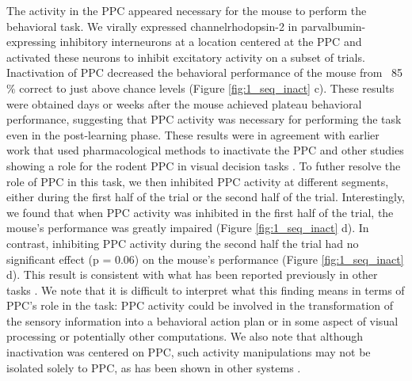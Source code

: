 \bigskip

The activity in the PPC appeared necessary for the mouse to perform the behavioral task. We virally expressed channelrhodopsin-2 in parvalbumin-expressing inhibitory interneurons at a location centered at the PPC and activated these neurons to inhibit excitatory activity on a subset of trials. Inactivation of PPC decreased the behavioral performance of the mouse from ~85 $\%$  correct to just above chance levels (Figure \ref{fig:1_seq_inact} c). These results were obtained days or weeks after the mouse achieved plateau behavioral performance, suggesting that PPC activity was necessary for performing the task even in the post-learning phase. These results were in agreement with earlier work that used pharmacological methods to inactivate the PPC and other studies showing a role for the rodent PPC in visual decision tasks \citep{Goard2016, Harvey:2012du, Licata2016, Raposo2014}. To futher resolve the role of PPC in this task, we then inhibited PPC activity at different segments, either during the first half of the trial or the second half of the trial. Interestingly, we found that when PPC activity was inhibited in the first half of the trial, the mouse's performance was greatly impaired (Figure \ref{fig:1_seq_inact} d). In contrast, inhibiting PPC activity during the second half the trial had no significant effect (p = 0.06) on the mouse's performance (Figure \ref{fig:1_seq_inact} d). This result is consistent with what has been reported previously in other tasks \citep{Goard2016, Licata2016, Raposo2014}. We note that it is difficult to interpret what this finding means in terms of PPC's role in the task: PPC activity could be involved in the transformation of the sensory information into a behavioral action plan or in some aspect of visual processing or potentially other computations. We also note that although inactivation was centered on PPC, such activity manipulations may not be isolated solely to PPC, as has been shown in other systems \citep{Otchy2015}.

